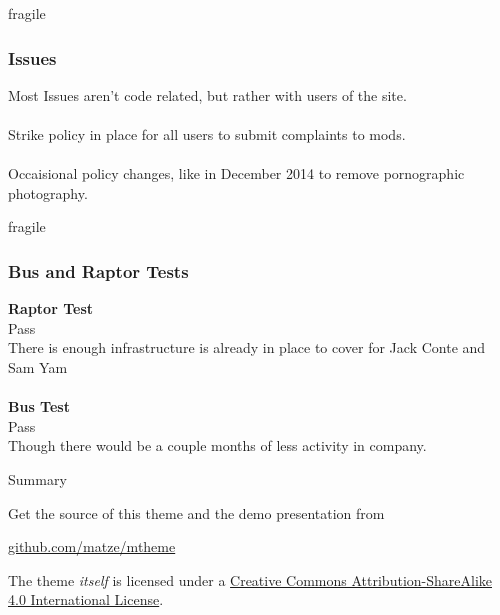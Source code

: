 \documentclass[10pt, compress]{beamer}
\begin{document}
\begin{frame}{fragile}
\frametitle{Issues}
Most Issues aren't code related, but rather with users of the site.\\ \\
Strike policy in place for all users to submit complaints to mods.\\ \\
Occaisional policy changes, like in December 2014 to remove pornographic photography.

\end{frame}

\begin{frame}{fragile}
\frametitle{Bus and Raptor Tests}
\textbf{Raptor Test} \\ 
Pass \\ There is enough infrastructure is already in place to cover for Jack Conte and Sam Yam \\
\\
\textbf{Bus Test} \\ 
Pass \\ Though there would be a couple months of less activity in company.

\end{frame}


\begin{frame}{Summary}

  Get the source of this theme and the demo presentation from

  \begin{center}\url{github.com/matze/mtheme}\end{center}

  The theme \emph{itself} is licensed under a
  \href{http://creativecommons.org/licenses/by-sa/4.0/}{Creative Commons
  Attribution-ShareAlike 4.0 International License}.

  \begin{center}\ccbysa\end{center}

\end{frame}
\end{document}
